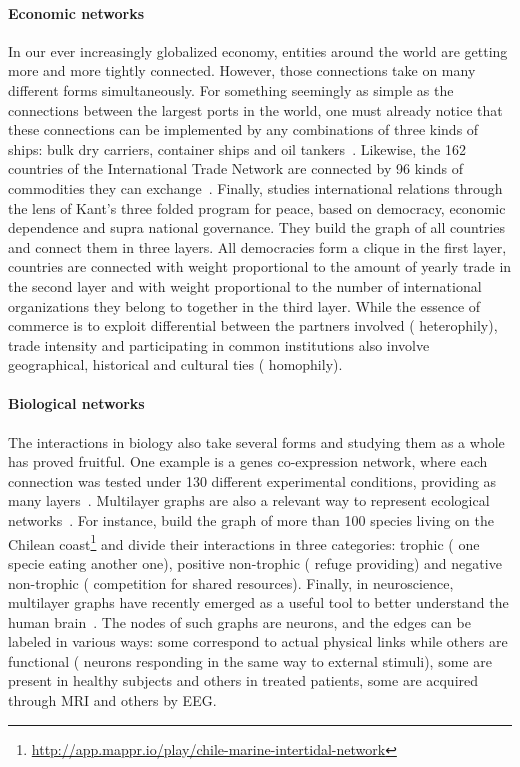 \paragraph{Economic networks} In our ever increasingly globalized economy, entities around the world
are getting more and more tightly connected. However, those connections take on many different
forms simultaneously. For something seemingly as simple as the connections
between the largest  ports in the world, one must already notice that these connections can be
implemented by any combinations of three kinds of ships: bulk dry carriers, container ships and oil
tankers~\autocite{ports3kindofships10}. Likewise, the 162 countries of the International Trade
Network are connected by 96 kinds of commodities they can exchange~\autocite{worldTradeNetwork10}.
Finally, \textcite{KantPeace15} studies international relations through the lens of Kant's three
folded program for peace,  based on democracy, economic dependence and supra national governance.
They build the graph of all countries and connect them in three layers. All democracies form a
clique in the first layer, countries are connected with weight proportional to the amount of yearly
trade in the second layer and with weight proportional to the number of international organizations
they belong to together in the third layer. While the essence of commerce is to exploit differential
between the partners involved (\ie{} heterophily), trade intensity and participating in
common institutions also involve geographical, historical and cultural ties (\ie{}
homophily).

\paragraph{Biological networks} The interactions in biology also take several forms and studying
them as a whole has proved fruitful. One example is a genes co-expression network, where each
connection was tested under 130 different experimental conditions, providing as many
layers~\autocite{bioLayerExp11}.
Multilayer graphs are also a relevant way to represent ecological
networks~\autocite{EcologyMultiReview17}. For instance, \textcite{EcoChile15} build the graph of
more than 100 species living on the Chilean
coast\footnote{\url{http://app.mappr.io/play/chile-marine-intertidal-network}} and divide their
interactions in three categories: trophic (\ie{} one specie eating another one), positive
non-trophic (\eg{} refuge providing) and negative non-trophic (\eg{} competition for shared
resources).
Finally, in neuroscience, multilayer graphs have recently emerged as a useful tool to better
understand the human brain~\autocite{Neuroscience16}. The nodes of such graphs are neurons, and the
edges can be labeled in various ways: some correspond to actual physical links while others are
functional (\ie{} neurons responding in the same way to external stimuli), some are present in
healthy subjects and others in treated patients, some are acquired through MRI and others by EEG.
